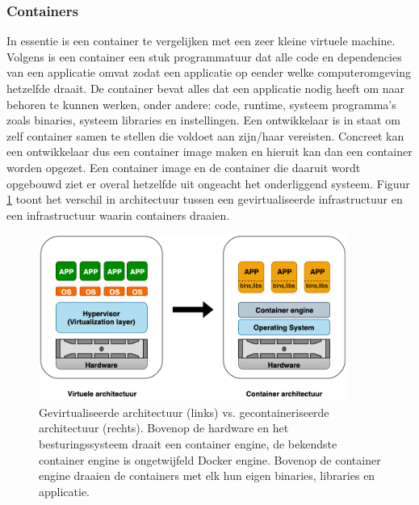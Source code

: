 \subsubsection{Containers}
In essentie is een container te vergelijken met een zeer kleine virtuele machine. Volgens \textcite{Docker2019} is een container een stuk programmatuur dat alle code en dependencies van een applicatie omvat zodat een applicatie op eender welke computeromgeving hetzelfde draait. De container bevat alles dat een applicatie nodig heeft om naar behoren te kunnen werken, onder andere: code, runtime, systeem programma's zoals binaries, systeem libraries en instellingen. Een ontwikkelaar is in staat om zelf container samen te stellen die voldoet aan zijn/haar vereisten. Concreet kan een ontwikkelaar dus een container image maken en hieruit kan dan een container worden opgezet. Een container image en de container die daaruit wordt opgebouwd ziet er overal hetzelfde uit ongeacht het onderliggend systeem. Figuur \ref{fig:virtualisatie_vs_containers} toont het verschil in architectuur tussen een gevirtualiseerde infrastructuur en een infrastructuur waarin containers draaien.
 \begin{figure}
     \centering
     \includegraphics[width=0.9\textwidth]{img/virtualisatie_vs_containers.png}
     \caption{Gevirtualiseerde architectuur (links) vs. gecontaineriseerde architectuur (rechts). Bovenop de hardware en het besturingssysteem draait een container engine, de bekendste container engine is ongetwijfeld Docker engine. Bovenop de container engine draaien de containers met elk hun eigen binaries, libraries en applicatie.} 
     \label{fig:virtualisatie_vs_containers}  
 \end{figure}


